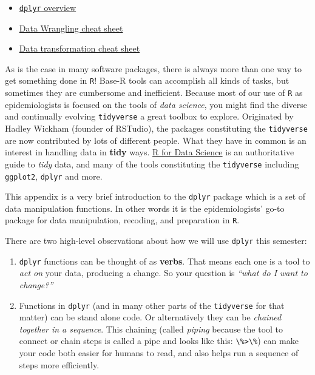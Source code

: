 \documentclass[
]{book}
\newcommand{\passthrough}[1]{#1}
\providecommand{\tightlist}{%
  \setlength{\itemsep}{0pt}\setlength{\parskip}{0pt}}
\begin{document}
\begin{itemize}
\tightlist
\item
  \href{https://dplyr.tidyverse.org/}{\passthrough{\lstinline!dplyr!} overview}
\item
  \href{https://rstudio.com/wp-content/uploads/2015/02/data-wrangling-cheatsheet.pdf}{Data Wrangling cheat sheet}
\item
  \href{https://github.com/rstudio/cheatsheets/blob/master/data-transformation.pdf}{Data transformation cheat sheet}
\end{itemize}

As is the case in many software packages, there is always more than one way to get something done in \passthrough{\lstinline!R!}! Base-R tools can accomplish all kinds of tasks, but sometimes they are cumbersome and inefficient. Because most of our use of \passthrough{\lstinline!R!} as epidemiologists is focused on the tools of \emph{data science}, you might find the diverse and continually evolving \passthrough{\lstinline!tidyverse!} a great toolbox to explore. Originated by Hadley Wickham (founder of RSTudio), the packages constituting the \passthrough{\lstinline!tidyverse!} are now contributed by lots of different people. What they have in common is an interest in handling data in \textbf{tidy} ways. \href{https://r4ds.had.co.nz/}{R for Data Science} is an authoritative guide to \emph{tidy} data, and many of the tools constituting the \passthrough{\lstinline!tidyverse!} including \passthrough{\lstinline!ggplot2!}, \passthrough{\lstinline!dplyr!} and more.

This appendix is a very brief introduction to the \passthrough{\lstinline!dplyr!} package which is a set of data manipulation functions. In other words it is the epidemiologists' go-to package for data manipulation, recoding, and preparation in \passthrough{\lstinline!R!}.

There are two high-level observations about how we will use \passthrough{\lstinline!dplyr!} this semester:

\begin{enumerate}
\def\labelenumi{\arabic{enumi}.}
\tightlist
\item
  \passthrough{\lstinline!dplyr!} functions can be thought of as \textbf{verbs}. That means each one is a tool to \emph{act on} your data, producing a change. So your question is \emph{``what do I want to change?''}
\item
  Functions in \passthrough{\lstinline!dplyr!} (and in many other parts of the \passthrough{\lstinline!tidyverse!} for that matter) can be stand alone code. Or alternatively they can be \emph{chained together in a sequence}. This chaining (called \emph{piping} because the tool to connect or chain steps is called a pipe and looks like this: \passthrough{\lstinline!\%>\%!}) can make your code both easier for humans to read, and also helps run a sequence of steps more efficiently.
\end{enumerate}
\end{document}
